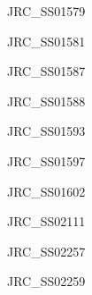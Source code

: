 \documentclass[17pt]{extarticle}
\begin{document}
\newpage\vspace*{-0.15cm}
\begin{large}
JRC\_SS01579 \\[0.5em]
\end{large}

\newpage\vspace*{-0.15cm}
\begin{large}
JRC\_SS01581 \\[0.5em]
\end{large}

\newpage\vspace*{-0.15cm}
\begin{large}
JRC\_SS01587 \\[0.5em]
\end{large}

\newpage\vspace*{-0.15cm}
\begin{large}
JRC\_SS01588 \\[0.5em]
\end{large}

\newpage\vspace*{-0.15cm}
\begin{large}
JRC\_SS01593 \\[0.5em]
\end{large}

\newpage\vspace*{-0.15cm}
\begin{large}
JRC\_SS01597 \\[0.5em]
\end{large}

\newpage\vspace*{-0.15cm}
\begin{large}
JRC\_SS01602 \\[0.5em]
\end{large}

\newpage\vspace*{-0.15cm}
\begin{large}
JRC\_SS02111 \\[0.5em]
\end{large}

\newpage\vspace*{-0.15cm}
\begin{large}
JRC\_SS02257 \\[0.5em]
\end{large}

\newpage\vspace*{-0.15cm}
\begin{large}
JRC\_SS02259 \\[0.5em]
\end{large}
\end{document}
